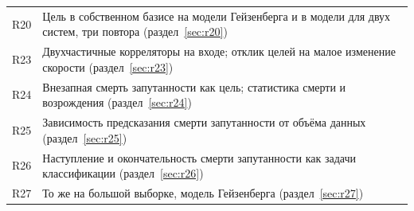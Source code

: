 \documentclass[12pt,a4paper]{report}
\numberwithin{equation}{chapter}
\begin{document}
\begin{center}
\begin{longtable}{@{}lp{12.6cm}@{}}
R20 & Цель в собственном базисе на модели Гейзенберга и в модели для двух
      систем, три повтора (раздел~\ref{sec:r20}) \\
R23 & Двухчастичные корреляторы на входе; отклик целей на малое изменение
      скорости (раздел~\ref{sec:r23}) \\
R24 & Внезапная смерть запутанности как цель; статистика смерти и
      возрождения (раздел~\ref{sec:r24}) \\
R25 & Зависимость предсказания смерти запутанности от объёма данных
      (раздел~\ref{sec:r25}) \\
R26 & Наступление и окончательность смерти запутанности как задачи
      классификации (раздел~\ref{sec:r26}) \\
R27 & То же на большой выборке, модель Гейзенберга
      (раздел~\ref{sec:r27}) \\
\bottomrule
\end{longtable}
\end{center}
\end{document}

